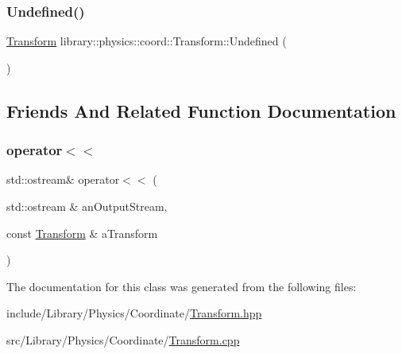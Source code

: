 \mbox{\label{classlibrary_1_1physics_1_1coord_1_1_transform_ac346b5703e94945a10ab222bf38d2a08}} 
\subsubsection{\texorpdfstring{Undefined()}{Undefined()}}
{\footnotesize\ttfamily \hyperlink{classlibrary_1_1physics_1_1coord_1_1_transform}{Transform} library\+::physics\+::coord\+::\+Transform\+::\+Undefined (\begin{DoxyParamCaption}{ }\end{DoxyParamCaption})\hspace{0.3cm}{\ttfamily [static]}}



\subsection{Friends And Related Function Documentation}
\mbox{\label{classlibrary_1_1physics_1_1coord_1_1_transform_ae46ab7a297c23b757fd6f41bf30c4054}} 
\subsubsection{\texorpdfstring{operator$<$$<$}{operator<<}}
{\footnotesize\ttfamily std\+::ostream\& operator$<$$<$ (\begin{DoxyParamCaption}\item[{std\+::ostream \&}]{an\+Output\+Stream,  }\item[{const \hyperlink{classlibrary_1_1physics_1_1coord_1_1_transform}{Transform} \&}]{a\+Transform }\end{DoxyParamCaption})\hspace{0.3cm}{\ttfamily [friend]}}



The documentation for this class was generated from the following files\+:\begin{DoxyCompactItemize}
\item 
include/\+Library/\+Physics/\+Coordinate/\hyperlink{_transform_8hpp}{Transform.\+hpp}\item 
src/\+Library/\+Physics/\+Coordinate/\hyperlink{_transform_8cpp}{Transform.\+cpp}\end{DoxyCompactItemize}
